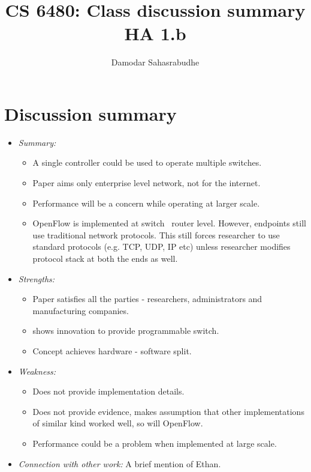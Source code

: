 \documentclass[letterpaper,twocolumn,10pt]{article}
\title{CS 6480: Class discussion summary\\
HA 1.b\\}
\author{Damodar Sahasrabudhe}
\affil{School of Computing, University of Utah}
\begin{document}
\maketitle
\section*{Discussion summary}

\begin{itemize}

\item {\it Summary:} 
\begin{itemize}
\item A single controller could be used to operate multiple switches. 
\item Paper aims only enterprise level network, not for the internet.
\item Performance will be a concern while operating at larger scale.
\item OpenFlow is implemented at switch \ router level. However, endpoints still use traditional network protocols. This still forces researcher to use standard protocols (e.g. TCP, UDP, IP etc) unless researcher modifies protocol stack at both the ends as well.

\end{itemize} 

\item {\it Strengths:} 
\begin{itemize}
\item Paper satisfies all the parties - researchers, administrators and manufacturing companies.
\item shows innovation to provide programmable switch.
\item Concept achieves hardware - software split.
\end{itemize}

\item {\it Weakness:} 
\begin{itemize}
\item Does not provide implementation details.
\item Does not provide evidence, makes assumption that other implementations of similar kind worked well, so will OpenFlow.
\item Performance could be a problem when implemented at large scale.
\end{itemize}


\item {\it Connection with other work:} 
A brief mention of Ethan\cite{Ethane}.


\end{itemize}
\end{document}
